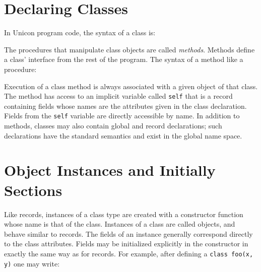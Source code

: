 \section{Declaring Classes}

In Unicon program code, the syntax of a class
is:


\noindent
The procedures that manipulate class objects are called
\textit{methods}. Methods define a
class' interface from the rest of the program. The
syntax of a method like a procedure:


Execution of a class method is always associated with a given object of
that class. The method has access to an implicit
variable called
\texttt{self} that is a record containing fields whose
names are the attributes given in the class declaration. Fields from
the \texttt{self} variable are directly accessible by name. In addition
to methods, classes may also contain global and
record declarations; such declarations have the standard semantics and
exist in the global name space.

\section{Object Instances and Initially Sections}

Like records, instances of a class type
are created with a constructor function whose
name is that of the class. Instances of a class are called objects, and
behave similar to records. The fields of an instance generally
correspond directly to the class attributes. Fields may be initialized
explicitly in the constructor in exactly the same way as for records.
For example, after defining a \texttt{class foo(x, y)} one may write:


